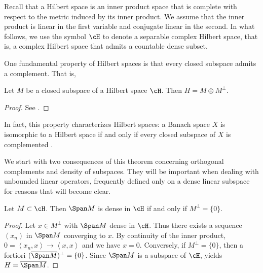 \documentclass[oneside,reqno,letterpaper]{amsart}
\begin{document}
Recall that a Hilbert space is an inner product space that is complete with respect to the metric induced by its inner product.
We assume that the inner product is linear in the first variable and conjugate linear in the second. 
In what follows, we use the symbol \(\cH\) to denote a separable complex Hilbert space, 
that is, a complex Hilbert space that admits a countable dense subset.


One fundamental property of Hilbert spaces is that every closed subspace admits a complement. 
That is, 

\begin{theorem}
\label{thm:hilbert-direct-sum}
  Let \(M\) be a closed subspace of a Hilbert space \(\cH\). Then \(H = M \oplus M^\perp\). 
\end{theorem}
\begin{proof}
  See \cite[pp.~137--138, Remark 5]{brezis2011functional}. 
\end{proof}

In fact, this property characterizes Hilbert spaces: a Banach space \(X\) is isomorphic to a Hilbert space if and only if every closed subspace of \(X\) is complemented \cite[p.~39]{brezis2011functional}. 


We start with two consequences of this theorem concerning orthogonal complements and density of subspaces. 
They will be important when dealing with unbounded linear operators, frequently defined only on a dense linear subspace for reasons that will become clear. 


\begin{proposition}
\label{thm:dense-subset-condition}
  Let \(M \subset \cH\). 
  Then \(\Span M\) is dense in \(\cH\) if and only if \(M^\perp = \{0\}\). 
\end{proposition}
\begin{proof}
  Let \(x \in M^{\perp}\) with \(\Span M\) dense in \(\cH\). Thus there exists a sequence \((x_{n})\) in \(\Span M\) converging to \(x\). 
  By continuity of the inner product, \(0 = \left< x_{n}, x \right> \to \left< x, x \right>\) and we have \(x = 0\).
  Conversely, if \(M^{\perp} = \{0\}\), then a fortiori \((\overline{\Span M})^{\perp} = \{0\}\). Since \(\Span M\) is a subspace of \(\cH\),  yields \(H = \overline{\Span M}\). 
\end{proof}
\end{document}
